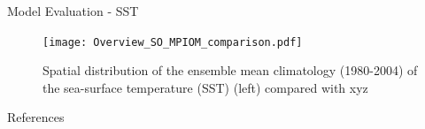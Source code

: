\documentclass[aspectratio=169]{beamer}
\begin{document}
\begin{frame}{Model Evaluation - SST}
\begin{figure}[h!]
	\centering
	\texttt{[image: Overview\_SO\_MPIOM\_comparison.pdf]} %
	\caption{Spatial distribution of the ensemble mean climatology (1980-2004) of the sea-surface temperature (SST) (left) compared with xyz}
	\label{fig:SO_comp_sst}
\end{figure}
\end{frame}

\begin{frame}[allowframebreaks]{References}
\baselineskip12pt



\end{frame}	
	
	
	
\end{document}
